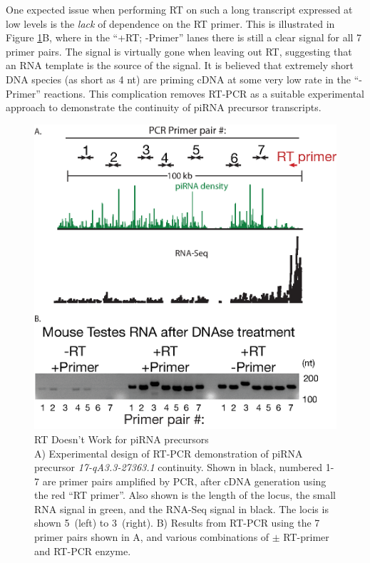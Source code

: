     One expected issue when performing RT on such a long transcript expressed at low levels is the \textit{lack} of dependence on the RT primer. This is illustrated in Figure \ref{SeqZipMethod:fig:RT doesn't work for precursors}B, where in the ``+RT; -Primer'' lanes there is still a clear signal for all 7 primer pairs. The signal is virtually gone when leaving out RT, suggesting that an RNA template is the source of the signal. It is believed that extremely short DNA species (as short as 4 nt) are priming cDNA at some very low rate in the ``-Primer'' reactions. This complication removes RT-PCR as a suitable experimental approach to demonstrate the continuity of piRNA precursor transcripts.

    \begin{figure} %
      \centering 
      \includegraphics{Figures/SeqZipMethod/RTDoesntWork.eps}
      \caption[pRT Doesn't Work for piRNA precursors]
      {
        RT Doesn't Work for piRNA precursors\\[0.25cm]
        A) Experimental design of RT-PCR demonstration of piRNA precursor \textit{17-qA3.3-27363.1} continuity. Shown in black, numbered 1-7 are primer pairs amplified by PCR, after cDNA generation using the red ``RT primer''. Also shown is the length of the locus, the small RNA signal in green, and the RNA-Seq signal in black. The locis is shown 5\textprime~(left) to 3\textprime~(right). B) Results from RT-PCR using the 7 primer pairs shown in A, and various combinations of $\pm$ RT-primer and RT-PCR enzyme.
      	}
      \label{SeqZipMethod:fig:RT doesn't work for precursors}
    	\end{figure}

